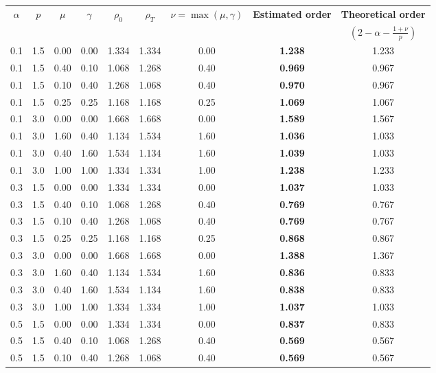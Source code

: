 \documentclass[12pt,a4paper]{article}
\theoremstyle{definition}
\begin{document}
\begin{table}[h]
\centering
\begin{tabular}{ccccccccc}
\hline
$\alpha$ & $p$ & $\mu$ & $\gamma$ & $\rho_0$ & $\rho_T$ & $\nu = \max(\mu,\gamma)$ & \textbf{Estimated order} & \textbf{Theoretical order} \\
 & & & & & & & & $(2 - \alpha - \frac{1+\nu}{p})$ \\
\hline
0.1 & 1.5 & 0.00 & 0.00 & 1.334 & 1.334 & 0.00 & \textbf{1.238} & 1.233 \\
0.1 & 1.5 & 0.40 & 0.10 & 1.068 & 1.268 & 0.40 & \textbf{0.969} & 0.967 \\
0.1 & 1.5 & 0.10 & 0.40 & 1.268 & 1.068 & 0.40 & \textbf{0.970} & 0.967 \\
0.1 & 1.5 & 0.25 & 0.25 & 1.168 & 1.168 & 0.25 & \textbf{1.069} & 1.067 \\
0.1 & 3.0 & 0.00 & 0.00 & 1.668 & 1.668 & 0.00 & \textbf{1.589} & 1.567 \\
0.1 & 3.0 & 1.60 & 0.40 & 1.134 & 1.534 & 1.60 & \textbf{1.036} & 1.033 \\
0.1 & 3.0 & 0.40 & 1.60 & 1.534 & 1.134 & 1.60 & \textbf{1.039} & 1.033 \\
0.1 & 3.0 & 1.00 & 1.00 & 1.334 & 1.334 & 1.00 & \textbf{1.238} & 1.233 \\
\hline
0.3 & 1.5 & 0.00 & 0.00 & 1.334 & 1.334 & 0.00 & \textbf{1.037} & 1.033 \\
0.3 & 1.5 & 0.40 & 0.10 & 1.068 & 1.268 & 0.40 & \textbf{0.769} & 0.767 \\
0.3 & 1.5 & 0.10 & 0.40 & 1.268 & 1.068 & 0.40 & \textbf{0.769} & 0.767 \\
0.3 & 1.5 & 0.25 & 0.25 & 1.168 & 1.168 & 0.25 & \textbf{0.868} & 0.867 \\
0.3 & 3.0 & 0.00 & 0.00 & 1.668 & 1.668 & 0.00 & \textbf{1.388} & 1.367 \\
0.3 & 3.0 & 1.60 & 0.40 & 1.134 & 1.534 & 1.60 & \textbf{0.836} & 0.833 \\
0.3 & 3.0 & 0.40 & 1.60 & 1.534 & 1.134 & 1.60 & \textbf{0.838} & 0.833 \\
0.3 & 3.0 & 1.00 & 1.00 & 1.334 & 1.334 & 1.00 & \textbf{1.037} & 1.033 \\
\hline
0.5 & 1.5 & 0.00 & 0.00 & 1.334 & 1.334 & 0.00 & \textbf{0.837} & 0.833 \\
0.5 & 1.5 & 0.40 & 0.10 & 1.068 & 1.268 & 0.40 & \textbf{0.569} & 0.567 \\
0.5 & 1.5 & 0.10 & 0.40 & 1.268 & 1.068 & 0.40 & \textbf{0.569} & 0.567 \\

\end{tabular}
\end{table}
\end{document}
